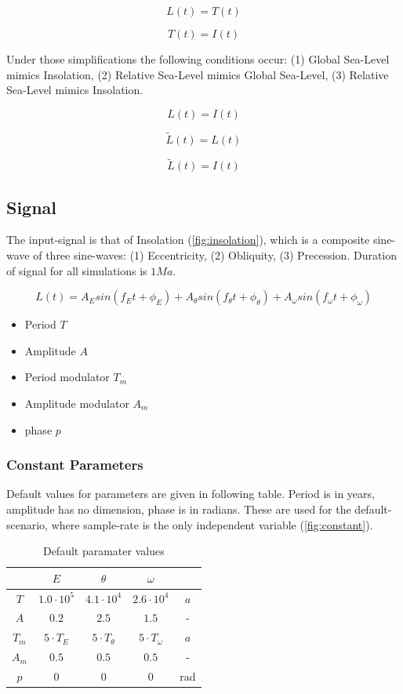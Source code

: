 \documentclass[12pt]{article}
\begin{document}
$$
L(t) = T(t)
$$

$$
T(t) = I(t)
$$

Under those simplifications the following conditions occur: (1) Global Sea-Level mimics Insolation, (2) Relative Sea-Level mimics Global Sea-Level, (3) Relative Sea-Level mimics Insolation.

$$
L(t) = I(t)
$$

$$
\tilde{L}(t) = L(t)
$$

$$
\tilde{L}(t) = I(t)
$$

\subsection*{Signal}

The input-signal is that of Insolation (\autoref{fig:insolation}), which is a composite sine-wave of three sine-waves: (1) Eccentricity, (2) Obliquity, (3) Precession. Duration of signal for all simulations is $1Ma$.

$$
L(t) = A_E sin(f_E t + \phi_E) + A_\theta sin(f_\theta t + \phi_\theta) + A_\omega sin(f_\omega t + \phi_\omega)
$$

\begin{itemize}
  \item Period $T$
  \item Amplitude $A$
  \item Period modulator $T_m$
  \item Amplitude modulator $A_m$
  \item phase $p$
\end{itemize}

\subsubsection*{Constant Parameters}

Default values for parameters are given in following table. Period is in years, amplitude has no dimension, phase is in radians. These are used for the default-scenario, where sample-rate is the only independent variable (\autoref{fig:constant}).

\begin{table}
\centering
\caption{Default paramater values}
\label{tab:default}
\begin{tabular}{c|c|c|c|c}
& $E$ & $\theta$ & $\omega$ & \\
\hline
$T$ & $1.0 \cdot 10^5$ & $4.1 \cdot 10^4$ & $2.6 \cdot 10^4$ & $a$ \\
$A$ & $0.2$ & $2.5$ & $1.5$ & - \\
$T_m$ & $5 \cdot T_E$ & $5 \cdot T_\theta$ & $5 \cdot T_\omega$ & $a$ \\
$A_m$ & $0.5$ & $0.5$ & $0.5$ & - \\
$p$ & 0 & 0 & 0 & rad \\
\end{tabular}
\end{table}
\end{document}
